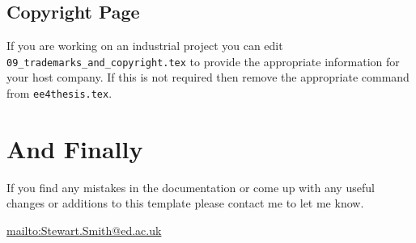 \documentclass[a4paper,12pt]{article}
\begin{document}
\subsection{Copyright Page}

If you are working on an industrial project you can edit \verb+09_trademarks_and_copyright.tex+ to provide the appropriate information for your host company.  If this is not required then remove the appropriate \verb++ command from \verb+ee4thesis.tex+.

\section{And Finally}

If you find any mistakes in the documentation or come up with any useful
changes or additions to this template please contact me to let me know.  

\url{mailto:Stewart.Smith@ed.ac.uk}
\end{document}
